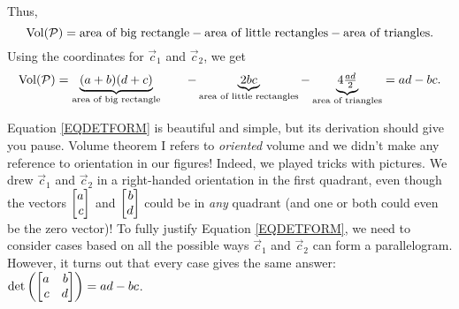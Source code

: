Thus,
\[
	\operatorname{Vol}(\mathcal P) = \text{area of big rectangle} - \text{area of little rectangles} - \text{area of triangles}.
\]
Using the coordinates for $\vec c_1$ and $\vec c_2$, we get
\begin{equation}
	\label{EQDETFORM}
	\operatorname{Vol}(\mathcal P) = \underbrace{(a+b)(d+c)}_{\text{area of big rectangle}} \qquad -
	\underbrace{2bc}_{\text{area of little rectangles}} -
	\underbrace{4\tfrac{ad}{2}}_{\text{area of triangles}} = ad-bc.
\end{equation}

\begin{center}
\end{center}

Equation \eqref{EQDETFORM} is beautiful and simple, but its derivation should give you pause. Volume theorem I refers
to \emph{oriented} volume and we didn't make any reference to orientation in our figures! Indeed, we played tricks
with pictures. We drew $\vec c_1$ and $\vec c_2$ in a right-handed orientation in the first quadrant, even though the
vectors $\mat{a\\c}$ and $\mat{b\\d}$ could be in \emph{any} quadrant (and one or both could even be the zero vector)!
To fully justify Equation \eqref{EQDETFORM}, we need to consider cases based on all the possible ways $\vec c_1$ and $\vec c_2$
can form a parallelogram. However, it turns out that every case gives the same answer: $\det\left(\mat{a&b\\c&d}\right)=ad-bc$.

